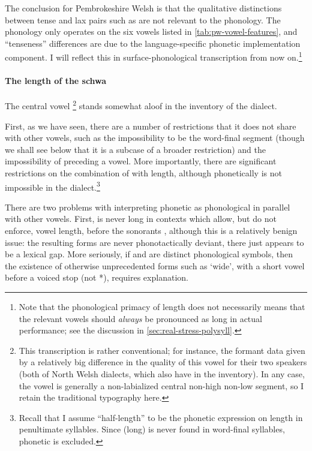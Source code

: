 The conclusion for Pembrokeshire Welsh is that the qualitative distinctions between tense and lax pairs such as  are not relevant to the phonology. The phonology only operates on the six vowels listed in \cref{tab:pw-vowel-features}, and \enquote{tenseness} differences are due to the language-specific phonetic implementation component. I will reflect this in surface\hyp phonological transcription from now on.\footnote{Note that the phonological primacy of length does not necessarily means that the relevant vowels should \emph{always} be pronounced as long in actual performance; see the discussion in \cref{sec:real-stress-polysyll}.}

\paragraph{The length of the schwa}
\label{sec:length-schwa}

The central vowel \ipa{[ə]}\footnote{This transcription is rather conventional; for instance, the formant data given by \citet{ball01:_welsh_phonet} a relatively big difference in the quality of this vowel for their two speakers (both of North Welsh dialects, which also have \ipa{[ɨ]} in the inventory). In any case, the vowel is generally a non-labialized central non-high non-low segment, so I retain the traditional typography here.} stands somewhat aloof in the inventory of the dialect.

First, as we have seen, there are a number of restrictions that it does not share with other vowels, such as the impossibility to be the word-final segment (though we shall see below that it is a subcase of a broader restriction) and the impossibility of preceding a vowel. More importantly, there are significant restrictions on the combination of \ipa{[ə]} with length, although phonetically  is not impossible in the dialect.\footnote{Recall that I assume \enquote{half\hyp length} to be the phonetic expression on length in penultimate syllables. Since (long) \ipa{[ə]} is never found in word\hyp final syllables, phonetic  is excluded.}

There are two problems with interpreting phonetic  as phonological \ipa{[əː]} in parallel with other vowels. First, \ipa{[ə]} is never long in contexts which allow, but do not enforce, vowel length, \ie before the sonorants \ipa{[l~n~r]}, although this is a relatively benign issue: the resulting forms are never phonotactically deviant, there just appears to be a lexical gap. More seriously, if \ipa{[ə]} and \ipa{[əː]} are distinct phonological symbols, then the existence of otherwise unprecedented forms such as \ipa{[ˈɬədan]} `wide', with a short vowel before a voiced stop (\ie not *\ipa{[ˈɬəːdan]}), requires explanation.

